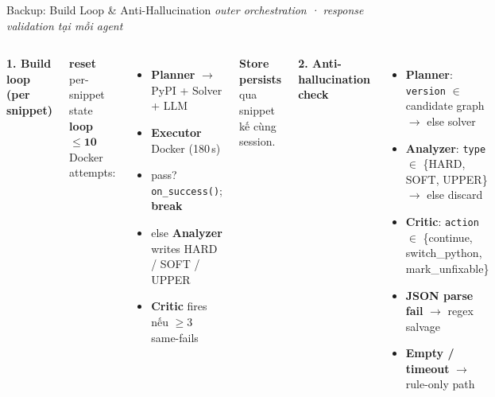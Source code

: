 \documentclass[aspectratio=169,10pt]{beamer}
\begin{document}
\begin{frame}{Backup: Build Loop \& Anti-Hallucination}
\vspace{0.1em}
{\tiny\color{gray}\textit{outer orchestration · response validation tại mỗi agent}}

\vspace{0.5em}
\begin{columns}[T,onlytextwidth]

\scriptsize\textbf{\color{navydeep}1. Build loop (per snippet)}

\vspace{0.4em}
\footnotesize
\textbf{reset} per-snippet state\\[0.4em]
\textbf{loop} $\le\!\mathbf{10}$ Docker attempts:
\begin{itemize}\setlength{\itemsep}{0.15em}\scriptsize
  \item \textbf{Planner} $\to$ PyPI + Solver + LLM
  \item \textbf{Executor} Docker (180\,s)
  \item pass? \texttt{on\_success()}; \textbf{break}
  \item else \textbf{Analyzer} writes HARD / SOFT / UPPER
  \item \textbf{Critic} fires nếu $\ge\!3$ same-fails
\end{itemize}

\vspace{0.4em}
\scriptsize\textbf{Store persists} qua snippet kế cùng session.

\scriptsize\textbf{\color{navydeep}2. Anti-hallucination check}

\vspace{0.4em}
\begin{itemize}\setlength{\itemsep}{0.25em}\scriptsize
  \item \textbf{Planner}: \texttt{version} $\in$ candidate graph $\to$ else solver
  \item \textbf{Analyzer}: \texttt{type} $\in$ \{HARD, SOFT, UPPER\} $\to$ else discard
  \item \textbf{Critic}: \texttt{action} $\in$ \{continue, switch\_python, mark\_unfixable\}
  \item \textbf{JSON parse fail} $\to$ regex salvage
  \item \textbf{Empty / timeout} $\to$ rule-only path
\end{itemize}
\end{columns}

\vspace{0.8em}
\end{frame}
\end{document}
